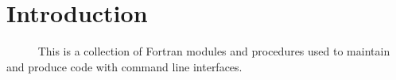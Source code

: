     

    \hypertarget{index_Introduction}{}\section{Introduction}\label{index_Introduction}
      This is a collection of Fortran modules and procedures used to maintain and produce code with command line interfaces.

      